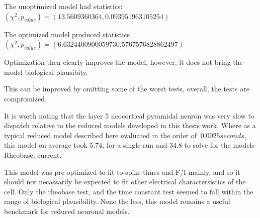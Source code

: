 The unoptimized model had statistics:
$(\chi^{2},p_{value})=(13.5609360364, 0.093951963105254)$

The optimized model produced statistics
$(\chi^{2},p_{value})=(6.632440090005973 0.5767576828862497)$

Optimization then clearly improves the model, however, it does not bring the model  biological plausibity.





This can be improved by omitting some of the worst tests, overall, the tests are compromized.



It is worth noting that the layer 5 neocortical pyramidal neuron was very slow to dispatch relative to the reduced models developed in this thesis work. Where as a typical reduced model described here evaluated in the order of $~0.0025 seconds$, this model on average took $5.74$, for a single run and $34.8$ to solve for the models Rheobase, current.

This model was pre-optimized to fit to spike times and F/I mainly, and so it should not necassarily be expected to fit other electrical charactersistics of the cell. Only the rheobase test, and the time constant test seemed to fall within the range of biological plausibility.
None the less, this model remains a useful benchmark for reduced neuronal models.